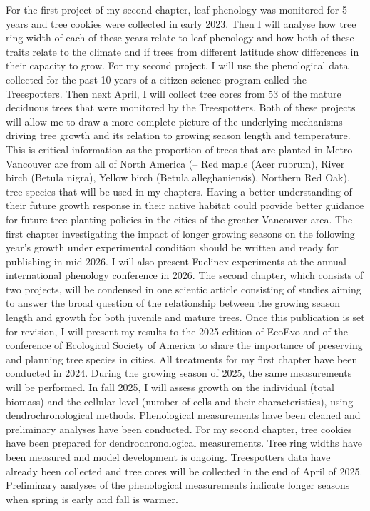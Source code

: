 \documentclass[11pt,letter]{article}
\begin{document}
For the first project of my second chapter, leaf phenology was monitored for 5 years and tree cookies were collected in early 2023. Then I will analyse how tree ring width of each of these years relate to leaf phenology and how both of these traits relate to the climate and if trees from different latitude show differences in their capacity to grow. For my second project, I will use the phenological data collected for the past 10 years of a citizen science program called the Treespotters. Then next April, I will collect tree cores from 53 of the mature deciduous trees that were monitored by the Treespotters. Both of these projects will allow me to draw a more complete picture of the underlying mechanisms driving tree growth and its relation to growing season length and temperature. This is critical information as the proportion of trees that are planted in Metro Vancouver are from all of North America (– Red maple (Acer rubrum), River birch (Betula nigra), Yellow birch (Betula alleghaniensis), Northern Red Oak), tree species that will be used in my chapters. Having a better understanding of their future growth response in their native habitat could provide better guidance for future tree planting policies in the cities of the greater Vancouver area. 
The first chapter investigating the impact of longer growing seasons on the following year’s growth under experimental condition should be written and ready for publishing in mid-2026. I will also present Fuelinex experiments at the annual international phenology conference in 2026.
The second chapter, which consists of two projects, will be condensed in one scientic article consisting of studies aiming to answer the broad question of the relationship between the growing season length and growth for both juvenile and mature trees. Once this publication is set for revision, I will present my results to the 2025 edition of EcoEvo and of the conference of Ecological Society of America to share the importance of preserving and planning tree species in cities.
All treatments for my first chapter have been conducted in 2024. During the growing season of 2025, the same measurements will be performed. In fall 2025, I will assess growth on the individual (total biomass) and the cellular level (number of cells and their characteristics), using dendrochronological methods. Phenological measurements have been cleaned and preliminary analyses have been conducted.
For my second chapter, tree cookies have been prepared for dendrochronological measurements. Tree ring widths have been measured and model development is ongoing. Treespotters data have already been collected and tree cores will be collected in the end of April of 2025. Preliminary analyses of the phenological measurements indicate longer seasons when spring is early and fall is warmer.  
\end{document}
